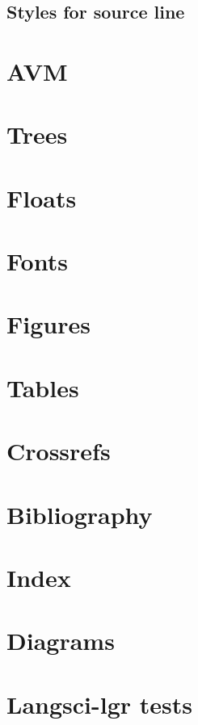 \documentclass[output=book
	      ,nonflat      ,modfonts,
	      ,colorlinks
	      ,showindex
	      ]{langsci/langscibook}
\begin{document}
\subsection{Styles for source line}



\section{AVM}
\section{Trees}

\section{Floats}
 
 

\section{Fonts}

%  
\section{Figures}\label{sec:tables}

\section{Tables}\label{sec:tables}

\section{Crossrefs}

\section{Bibliography}

\printbibliography[heading=references] 
\section{Index}
 
\section{Diagrams}
 
%  
% 
%  
\section{Langsci-lgr tests}
 
\end{document}
